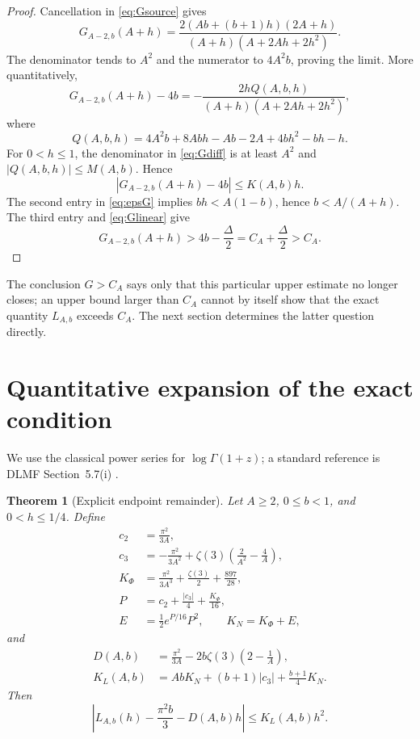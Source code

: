\documentclass[11pt]{article}
\newtheorem{theorem}{Theorem}
\theoremstyle{remark}
\begin{document}
\begin{proof}
Cancellation in \eqref{eq:Gsource} gives
\begin{equation}
 G_{A-2,b}(A+h)=
 \frac{2(Ab+(b+1)h)(2A+h)}
 {(A+h)(A+2Ah+2h^2)}.                                   \label{eq:Grational}
\end{equation}
The denominator tends to $A^2$ and the numerator to $4A^2b$, proving the
limit.  More quantitatively,
\begin{equation}
 G_{A-2,b}(A+h)-4b
 =-\frac{2hQ(A,b,h)}{(A+h)(A+2Ah+2h^2)},                 \label{eq:Gdiff}
\end{equation}
where
\[
 Q(A,b,h)=4A^2b+8Abh-Ab-2A+4bh^2-bh-h.
\]
For $0<h\leq1$, the denominator in \eqref{eq:Gdiff} is at least $A^2$
and $|Q(A,b,h)|\leq M(A,b)$.  Hence
\begin{equation}
 |G_{A-2,b}(A+h)-4b|\leq K(A,b)h.                       \label{eq:Glinear}
\end{equation}
The second entry in \eqref{eq:epsG} implies
$bh<A(1-b)$, hence $b<A/(A+h)$.  The third entry and
\eqref{eq:Glinear} give
\[
 G_{A-2,b}(A+h)>4b-\frac\Delta2
  =C_A+\frac\Delta2>C_A.
\]
\end{proof}

The conclusion $G>C_A$ says only that this particular upper estimate no
longer closes; an upper bound larger than $C_A$ cannot by itself show that
the exact quantity $L_{A,b}$ exceeds $C_A$.  The next section determines
the latter question directly.

\section{Quantitative expansion of the exact condition}

We use the classical power series for $\log\Gamma(1+z)$; a standard
reference is DLMF Section~5.7(i) \cite{dlmf}.

\begin{theorem}[Explicit endpoint remainder]\label{thm:remainder}
Let $A\geq2$, $0\leq b<1$, and $0<h\leq1/4$.  Define
\begin{align*}
 c_2&=\frac{\pi^2}{3A},\\
 c_3&=-\frac{\pi^2}{3A^2}
       +\zeta(3)\left(\frac2{A^2}-\frac4A\right),\\
 K_\Phi&=\frac{\pi^2}{3A^3}+\frac{\zeta(3)}2+\frac{897}{28},\\
 P&=c_2+\frac{|c_3|}{4}+\frac{K_\Phi}{16},\\
 E&=\frac12 e^{P/16}P^2,\qquad K_N=K_\Phi+E,
\end{align*}
and
\begin{align}
 D(A,b)&=\frac{\pi^2}{3A}
       -2b\zeta(3)\left(2-\frac1A\right),                \label{eq:D}\\
 K_L(A,b)&=AbK_N+(b+1)|c_3|+\frac{b+1}{4}K_N.             \label{eq:KL}
\end{align}
Then
\begin{equation}
 \left|L_{A,b}(h)-\frac{\pi^2b}{3}-D(A,b)h\right|
 \leq K_L(A,b)h^2.                                      \label{eq:mainbound}
\end{equation}
\end{theorem}
\end{document}
